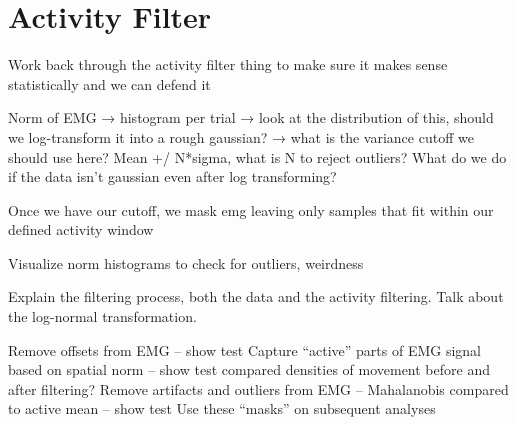 \documentclass[../main.tex]{subfiles}
\begin{document}
\section{Activity Filter}

Work back through the activity filter thing to make sure it makes sense statistically and we can defend it

Norm of EMG → histogram per trial → look at the distribution of this, should we log-transform it into a rough gaussian? → what is the variance cutoff we should use here? Mean +/ N*sigma, what is N to reject outliers? What do we do if the data isn’t gaussian even after log transforming?

Once we have our cutoff, we mask emg leaving only samples that fit within our defined activity window

Visualize norm histograms to check for outliers, weirdness

Explain the filtering process, both the data and the activity filtering. Talk about the log-normal transformation.

Remove offsets from EMG – show test
Capture “active” parts of EMG signal based on spatial norm – show test compared densities of movement before and after filtering?
Remove artifacts and outliers from EMG – Mahalanobis compared to active mean – show test
Use these “masks” on subsequent analyses


\end{document}
